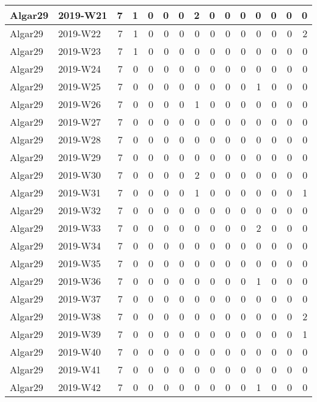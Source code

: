 \documentclass[]{book}
\begin{document}
\begin{table}
\begin{tabular}[t]{l|l|r|r|r|r|r|r|r|r|r|r|r|r|r}
\hline
Algar29 & 2019-W21 & 7 & 1 & 0 & 0 & 0 & 2 & 0 & 0 & 0 & 0 & 0 & 0 & 0\\
\hline
Algar29 & 2019-W22 & 7 & 1 & 0 & 0 & 0 & 0 & 0 & 0 & 0 & 0 & 0 & 0 & 2\\
\hline
Algar29 & 2019-W23 & 7 & 1 & 0 & 0 & 0 & 0 & 0 & 0 & 0 & 0 & 0 & 0 & 0\\
\hline
Algar29 & 2019-W24 & 7 & 0 & 0 & 0 & 0 & 0 & 0 & 0 & 0 & 0 & 0 & 0 & 0\\
\hline
Algar29 & 2019-W25 & 7 & 0 & 0 & 0 & 0 & 0 & 0 & 0 & 0 & 1 & 0 & 0 & 0\\
\hline
Algar29 & 2019-W26 & 7 & 0 & 0 & 0 & 0 & 1 & 0 & 0 & 0 & 0 & 0 & 0 & 0\\
\hline
Algar29 & 2019-W27 & 7 & 0 & 0 & 0 & 0 & 0 & 0 & 0 & 0 & 0 & 0 & 0 & 0\\
\hline
Algar29 & 2019-W28 & 7 & 0 & 0 & 0 & 0 & 0 & 0 & 0 & 0 & 0 & 0 & 0 & 0\\
\hline
Algar29 & 2019-W29 & 7 & 0 & 0 & 0 & 0 & 0 & 0 & 0 & 0 & 0 & 0 & 0 & 0\\
\hline
Algar29 & 2019-W30 & 7 & 0 & 0 & 0 & 0 & 2 & 0 & 0 & 0 & 0 & 0 & 0 & 0\\
\hline
Algar29 & 2019-W31 & 7 & 0 & 0 & 0 & 0 & 1 & 0 & 0 & 0 & 0 & 0 & 0 & 1\\
\hline
Algar29 & 2019-W32 & 7 & 0 & 0 & 0 & 0 & 0 & 0 & 0 & 0 & 0 & 0 & 0 & 0\\
\hline
Algar29 & 2019-W33 & 7 & 0 & 0 & 0 & 0 & 0 & 0 & 0 & 0 & 2 & 0 & 0 & 0\\
\hline
Algar29 & 2019-W34 & 7 & 0 & 0 & 0 & 0 & 0 & 0 & 0 & 0 & 0 & 0 & 0 & 0\\
\hline
Algar29 & 2019-W35 & 7 & 0 & 0 & 0 & 0 & 0 & 0 & 0 & 0 & 0 & 0 & 0 & 0\\
\hline
Algar29 & 2019-W36 & 7 & 0 & 0 & 0 & 0 & 0 & 0 & 0 & 0 & 1 & 0 & 0 & 0\\
\hline
Algar29 & 2019-W37 & 7 & 0 & 0 & 0 & 0 & 0 & 0 & 0 & 0 & 0 & 0 & 0 & 0\\
\hline
Algar29 & 2019-W38 & 7 & 0 & 0 & 0 & 0 & 0 & 0 & 0 & 0 & 0 & 0 & 0 & 2\\
\hline
Algar29 & 2019-W39 & 7 & 0 & 0 & 0 & 0 & 0 & 0 & 0 & 0 & 0 & 0 & 0 & 1\\
\hline
Algar29 & 2019-W40 & 7 & 0 & 0 & 0 & 0 & 0 & 0 & 0 & 0 & 0 & 0 & 0 & 0\\
\hline
Algar29 & 2019-W41 & 7 & 0 & 0 & 0 & 0 & 0 & 0 & 0 & 0 & 0 & 0 & 0 & 0\\
\hline
Algar29 & 2019-W42 & 7 & 0 & 0 & 0 & 0 & 0 & 0 & 0 & 0 & 1 & 0 & 0 & 0\\

\end{tabular}
\end{table}
\end{document}
